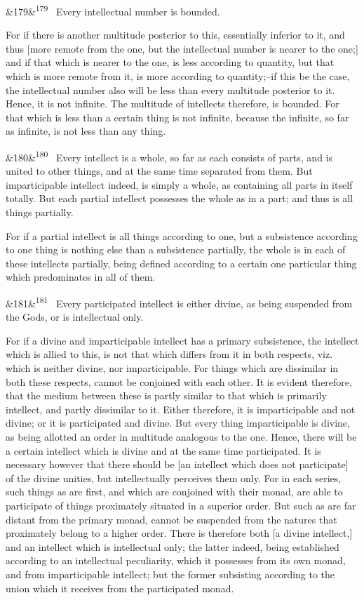 \documentclass[12pt]{article}
\newcommand{\para}[1][]{\par\noindent\ifx&#1&\else\textsuperscript{\footnotesize #1}~\fi}
\begin{document}
\para[179] Every intellectual number is bounded.

For if there is another multitude posterior to this, essentially inferior to it, and thus [more remote from the one, but the intellectual number is nearer to the one;] and if that which is nearer to the one, is less according to quantity, but that which is more remote from it, is more according to quantity;--if this be the case, the intellectual number also will be less than every multitude posterior to it. Hence, it is not infinite. The multitude of intellects therefore, is bounded. For that which is less than a certain thing is not infinite, because the infinite, so far as infinite, is not less than any thing.

\para[180] Every intellect is a whole, so far as each consists of parts, and is united to other things, and at the same time separated from them. But imparticipable intellect indeed, is simply a whole, as containing all parts in itself totally. But each partial intellect possesses the whole as in a part; and thus is all things partially.

For if a partial intellect is all things according to one, but a subsistence according to one thing is nothing else than a subsistence partially, the whole is in each of these intellects partially, being defined according to a certain one particular thing which predominates in all of them.

\para[181] Every participated intellect is either divine, as being suspended from the Gods, or is intellectual only.

For if a divine and imparticipable intellect has a primary subsistence, the intellect which is allied to this, is not that which differs from it in both respects, viz. which is neither divine, nor imparticipable. For things which are dissimilar in both these respects, cannot be conjoined with each other. It is evident therefore, that the medium between these is partly similar to that which is primarily intellect, and partly dissimilar to it. Either therefore, it is imparticipable and not divine; or it is participated and divine. But every thing imparticipable is divine, as being allotted an order in multitude analogous to the one. Hence, there will be a certain intellect which is divine and at the same time participated. It is necessary however that there should be [an intellect which does not participate] of the divine unities, but intellectually perceives them only. For in each series, such things as are first, and which are conjoined with their monad, are able to participate of things proximately situated in a superior order. But such as are far distant from the primary monad, cannot be suspended from the natures that proximately belong to a higher order. There is therefore both [a divine intellect,] and an intellect which is intellectual only; the latter indeed, being established according to an intellectual peculiarity, which it possesses from its own monad, and from imparticipable intellect; but the former subsisting according to the union which it receives from the participated monad.
\end{document}
